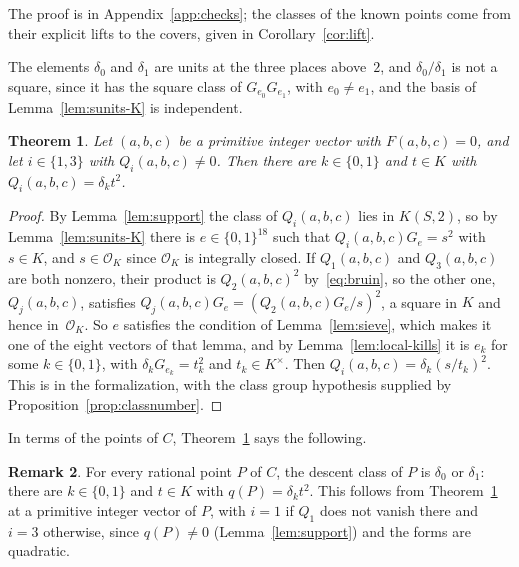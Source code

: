 \documentclass[11pt]{amsart}
\newtheorem{theorem}{Theorem}[section]
\theoremstyle{definition}
\newtheorem{remark}[theorem]{Remark}
\numberwithin{equation}{section}
\newcommand{\OK}{\mathcal{O}_K}
\newcommand{\lean}[1]{\ignorespaces}
\begin{document}
The proof is in Appendix~\ref{app:checks}; the classes of the known points come from their explicit lifts to the covers, given in Corollary~\ref{cor:lift}.

The elements $\delta_0$ and $\delta_1$ are units at the three places above~$2$, and $\delta_0/\delta_1$ is not a square, since it has the square class of $G_{e_0}G_{e_1}$, with $e_0\neq e_1$, and the basis of Lemma~\ref{lem:sunits-K} is independent.

\begin{theorem}\label{thm:selmer-set}\lean{FurioLombardo.M1.selmer_int, FurioLombardo.M2.Proved.clK21TwoTorsionTrivial}
Let $(a,b,c)$ be a primitive integer vector with $F(a,b,c)=0$, and let $i\in\{1,3\}$ with $Q_i(a,b,c)\neq0$. Then there are $k\in\{0,1\}$ and $t\in K$ with $Q_i(a,b,c)=\delta_kt^2$.
\end{theorem}

\begin{proof}
By Lemma~\ref{lem:support} the class of $Q_i(a,b,c)$ lies in $K(S,2)$, so by Lemma~\ref{lem:sunits-K} there is $e\in\{0,1\}^{18}$ such that $Q_i(a,b,c)G_e=s^2$ with $s\in K$, and $s\in\OK$ since $\OK$ is integrally closed. If $Q_1(a,b,c)$ and $Q_3(a,b,c)$ are both nonzero, their product is $Q_2(a,b,c)^2$ by~\eqref{eq:bruin}, so the other one, $Q_j(a,b,c)$, satisfies $Q_j(a,b,c)G_e=(Q_2(a,b,c)G_e/s)^2$, a square in $K$ and hence in~$\OK$. So $e$ satisfies the condition of Lemma~\ref{lem:sieve}, which makes it one of the eight vectors of that lemma, and by Lemma~\ref{lem:local-kills} it is $e_k$ for some $k\in\{0,1\}$, with $\delta_kG_{e_k}=t_k^2$ and $t_k\in K^\times$. Then $Q_i(a,b,c)=\delta_k(s/t_k)^2$. This is  in the formalization, with the class group hypothesis supplied by Proposition~\ref{prop:classnumber}.
\end{proof}

In terms of the points of $C$, Theorem~\ref{thm:selmer-set} says the following.

\begin{remark}\label{rem:selmer-class}\lean{FurioLombardo.M1.selmerSet, FurioLombardo.M1.selmerSet_class, FurioLombardo.M2.Proved.clK21TwoTorsionTrivial}
For every rational point $P$ of $C$, the descent class of $P$ is $\delta_0$ or $\delta_1$: there are $k\in\{0,1\}$ and $t\in K$ with $q(P)=\delta_kt^2$. This follows from Theorem~\ref{thm:selmer-set} at a primitive integer vector of $P$, with $i=1$ if $Q_1$ does not vanish there and $i=3$ otherwise, since $q(P)\neq0$ (Lemma~\ref{lem:support}) and the forms are quadratic.
\end{remark}
\end{document}
